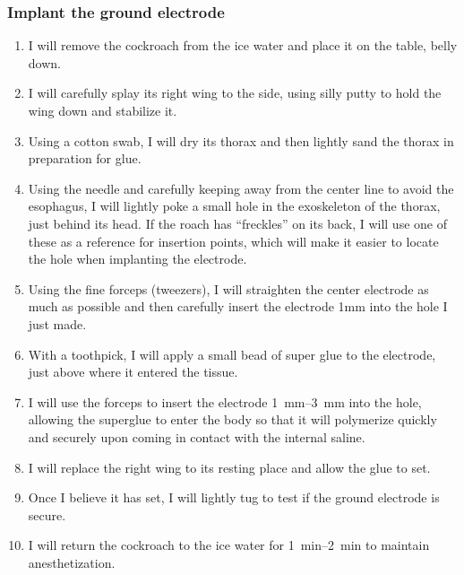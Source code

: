\subsubsection{Implant the ground electrode}
\begin{enumerate}
    \item I will remove the cockroach from the ice water and place it on the table, belly down.
    \item I will carefully splay its right wing to the side, using silly putty to hold the wing down and stabilize it.
    \item Using a cotton swab, I will dry its thorax and then lightly sand the thorax in preparation for glue.
    \item Using the needle and carefully keeping away from the center line to avoid the esophagus, I will lightly poke a small hole in the exoskeleton of the thorax, just behind its head.
        \subitem  If the roach has ``freckles'' on its back, I will use one of these as a reference for insertion points, which will make it easier to locate the hole when implanting the electrode.
    \item Using the fine forceps (tweezers), I will straighten the center electrode as much as possible and then carefully insert the electrode 1mm into the hole I just made.
    \item  With a toothpick, I will apply a small bead of super glue to the electrode, just above where it entered the tissue.
    \item I will use the forceps to insert the electrode \SIrange{1}{3}{\milli\meter} into the hole, allowing the superglue to enter the body so that it will polymerize quickly and securely upon coming in contact with the internal saline.
    \item I will replace the right wing to its resting place and allow the glue to set.
    \item Once I believe it has set, I will lightly tug to test if the ground electrode is secure.
    \item I will return the cockroach to the ice water for \SIrange{1}{2}{\minute} to maintain anesthetization.
\end{enumerate}

